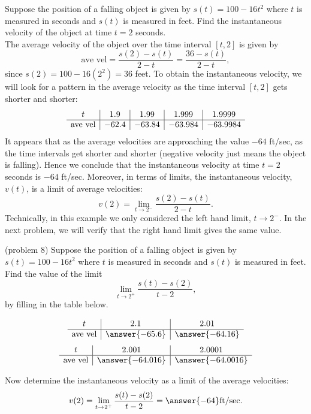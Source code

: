 \documentclass[handout]{ximera}
\begin{document}
\begin{example}[example 8]
Suppose the position of a falling object is given by $s(t) = 100-16t^2$ where $t$ is measured in seconds and $s(t)$ is measured in feet.
Find the instantaneous velocity of the object at time $t = 2$ seconds.\\
The average velocity of the object over the time interval $[t,2]$ is given by 
\[
\text{ave vel} = \frac{s(2)-s(t)}{2-t} = \frac{36-s(t)}{2-t},
\]
since $s(2) = 100 - 16(2^2) = 36$ feet.
To obtain the instantaneous velocity, we will look for a pattern in the average velocity as the time interval $[t, 2]$ gets shorter and shorter:
\[
\begin{array}{ c | c | c | c | c }
 t & 1.9 & 1.99  & 1.999 & 1.9999 \\ 
	\hline 
	 \text{ave vel} & -62.4 & -63.84 & -63.984 & -63.9984
\end{array}
\]  
It appears that as the average velocities are approaching the value $-64$ ft/sec, as the time intervals 
get shorter and shorter (negative velocity just means the object is falling).  Hence we conclude that the instantaneous velocity at time $t = 2$ seconds is $-64$ ft/sec.
Moreover, in terms of limits, the instantaneous velocity, $v(t)$, is a limit of average velocities:
\[
v(2) = \lim_{t\to 2^-} \frac{s(2) - s(t)}{2-t}.
\]
Technically, in this example we only considered the left hand limit, $t\to 2^-$.
In the next problem, we will verify that the right hand limit gives the same value. 
\end{example}

\begin{problem}(problem 8)
Suppose the position of a falling object is given by $s(t) = 100-16t^2$ where $t$ is measured in seconds and $s(t)$ is measured in feet.
Find the value of the limit
\[
\lim_{t\to 2^+} \frac{s(t) - s(2)}{t-2},
\]
by filling in the table below.

\begin{prompt}
\begin{center}
\[
\begin{array}{ c | c | c }
  t & 2.1 & 2.01   \\ 
	\hline 
	 \text{ave vel} & \answer{-65.6} & \answer{-64.16} 
\end{array}
\]
\[
\begin{array}{ c | c | c  }
  t  & 2.001 & 2.0001 \\ 
	\hline 
	 \text{ave vel} & \answer{-64.016} & \answer{-64.0016}
\end{array}
\]
\end{center}
Now determine the instantaneous velocity as a limit of the average velocities:
\[
v(2) = \lim_{t\to 2^+} \frac{s(t) - s(2)}{t-2} = \answer{-64} \text{ft/sec}.
\]
\end{prompt}



\end{problem}


\begin{center}
\begin{foldable}
\end{foldable}
\end{center}
\end{document}
